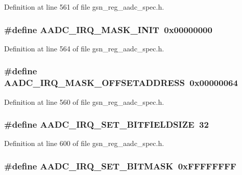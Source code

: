Definition at line 561 of file gsn\_\-reg\_\-aadc\_\-spec.h.

\hypertarget{a00543_a76d66e9095b465a199d9e59030ac300b}{
\subsubsection[{AADC\_\-IRQ\_\-MASK\_\-INIT}]{\setlength{\rightskip}{0pt plus 5cm}\#define AADC\_\-IRQ\_\-MASK\_\-INIT~0x00000000}}
\label{a00543_a76d66e9095b465a199d9e59030ac300b}


Definition at line 564 of file gsn\_\-reg\_\-aadc\_\-spec.h.

\hypertarget{a00543_a2beae179cd2a8c73f653e96a29169c21}{
\subsubsection[{AADC\_\-IRQ\_\-MASK\_\-OFFSETADDRESS}]{\setlength{\rightskip}{0pt plus 5cm}\#define AADC\_\-IRQ\_\-MASK\_\-OFFSETADDRESS~0x00000064}}
\label{a00543_a2beae179cd2a8c73f653e96a29169c21}


Definition at line 560 of file gsn\_\-reg\_\-aadc\_\-spec.h.

\hypertarget{a00543_a00919a11975076f38d546ced79f55a92}{
\subsubsection[{AADC\_\-IRQ\_\-SET\_\-BITFIELDSIZE}]{\setlength{\rightskip}{0pt plus 5cm}\#define AADC\_\-IRQ\_\-SET\_\-BITFIELDSIZE~32}}
\label{a00543_a00919a11975076f38d546ced79f55a92}


Definition at line 600 of file gsn\_\-reg\_\-aadc\_\-spec.h.

\hypertarget{a00543_ab14526c6b4a360283714606a082ff71b}{
\subsubsection[{AADC\_\-IRQ\_\-SET\_\-BITMASK}]{\setlength{\rightskip}{0pt plus 5cm}\#define AADC\_\-IRQ\_\-SET\_\-BITMASK~0xFFFFFFFF}}
\label{a00543_ab14526c6b4a360283714606a082ff71b}


